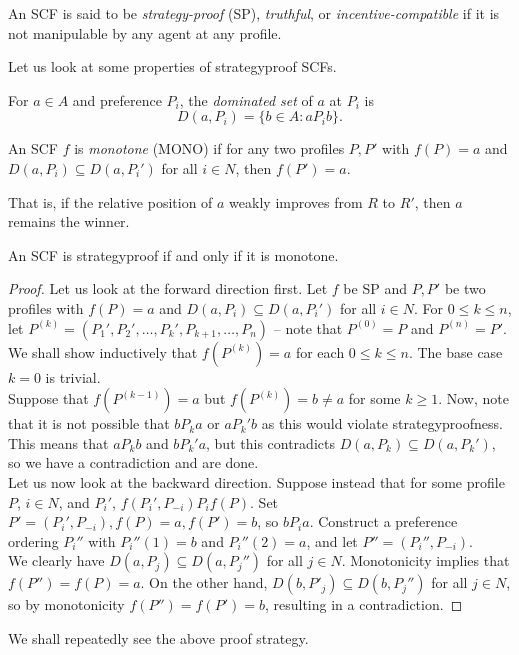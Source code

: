 	\begin{fdef}[Strategyproofness]
		An SCF is said to be \emph{strategy-proof} (SP), \emph{truthful}, or \emph{incentive-compatible} if it is not manipulable by any agent at any profile.
	\end{fdef}

	Let us look at some properties of strategyproof SCFs.

	\begin{fdef}
		For $a \in A$ and preference $P_i$, the \emph{dominated set} of $a$ at $P_i$ is
		\[ D(a,P_i) = \{ b \in A : a P_i b \}. \]
	\end{fdef}

	\begin{fdef}[Monotonicity]
		An SCF $f$ is \emph{monotone} (MONO) if for any two profiles $P,P'$ with $f(P) = a$ and $D(a,P_i) \subseteq D(a,P_i')$ for all $i \in N$, then $f(P') = a$.
	\end{fdef}
	That is, if the relative position of $a$ weakly improves from $R$ to $R'$, then $a$ remains the winner.

	\begin{flem}
		\label{lem: sp iff mono}
		An SCF is strategyproof if and only if it is monotone.
	\end{flem}
	\begin{proof}
		Let us look at the forward direction first. Let $f$ be SP and $P,P'$ be two profiles with $f(P) = a$ and $D(a,P_i) \subseteq D(a,P_i')$ for all $i \in N$. For $0 \le k \le n$, let $P^{(k)} = (P_1',P_2',\ldots,P_k',P_{k+1},\ldots,P_n)$ -- note that $P^{(0)} = P$ and $P^{(n)} = P'$. We shall show inductively that $f(P^{(k)}) = a$ for each $0 \le k \le n$. The base case $k = 0$ is trivial.\\
		Suppose that $f(P^{(k-1)}) = a$ but $f(P^{(k)}) = b \ne a$ for some $k \ge 1$.
		Now, note that it is not possible that $b P_k a$ or $a P_k' b$ as this would violate strategyproofness. This means that $a P_k b$ and $b P_k' a$, but this contradicts $D(a,P_k) \subseteq D(a,P_k')$, so we have a contradiction and are done.\\

		Let us now look at the backward direction. Suppose instead that for some profile $P$, $i \in N$, and $P_i'$, $f(P_i',P_{-i}) P_i f(P)$. Set $P' = (P_i',P_{-i}), f(P) = a, f(P') = b$, so $b P_i a$. Construct a preference ordering $P_i''$ with $P_i''(1) = b$ and $P_i''(2) = a$, and let $P'' = (P_i'',P_{-i})$.\\
		We clearly have $D(a,P_j) \subseteq D(a,P_j'')$ for all $j \in N$. Monotonicity implies that $f(P'') = f(P) = a$. On the other hand, $D(b,P'_j) \subseteq D(b,P_j'')$ for all $j \in N$, so by monotonicity $f(P'') = f(P') = b$, resulting in a contradiction.
	\end{proof}
	We shall repeatedly see the above proof strategy.

